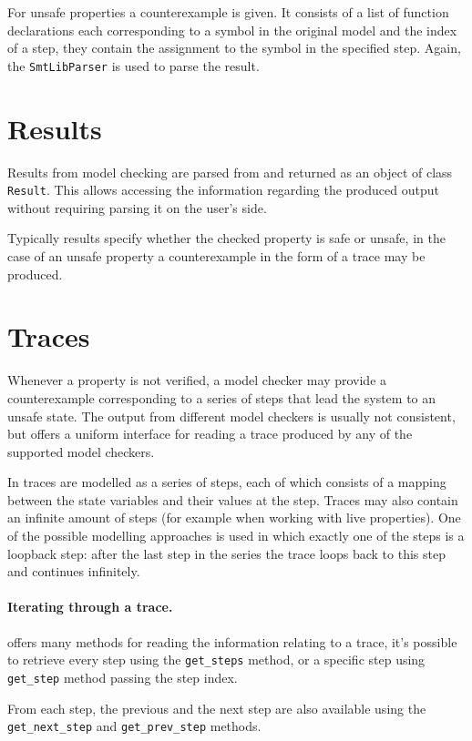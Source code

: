 For unsafe properties a counterexample is given. It consists of a list of function declarations each corresponding to a symbol in the original model and the index of a step, they contain the assignment to the symbol in the specified step. Again, the \texttt{SmtLibParser} is used to parse the result.


\section{Results}
Results from model checking are parsed from \pyvmt{} and returned as an object of class \texttt{Result}.
This allows accessing the information regarding the produced output without requiring parsing it on the user's side.

Typically results specify whether the checked property is safe or unsafe, in the case of an unsafe property a counterexample in the form of a trace may be produced.

\section{Traces}
Whenever a property is not verified, a model checker may provide a counterexample corresponding to a series of steps that lead the system to an unsafe state.
The output from different model checkers is usually not consistent, but \pyvmt{} offers a uniform interface for reading a trace produced by any of the supported model checkers.

In \pyvmt{} traces are modelled as a series of steps, each of which consists of a mapping between the state variables and their values at the step.
Traces may also contain an infinite amount of steps (for example when working with live properties).
One of the possible modelling approaches is used in which exactly one of the steps is a loopback step: after the last step in the series the trace loops back to this step and continues infinitely.

\paragraph*{Iterating through a trace.}
\pyvmt{} offers many methods for reading the information relating to a trace, it's possible to retrieve every step using the \texttt{get\_steps} method, or a specific step using \texttt{get\_step} method passing the step index.

From each step, the previous and the next step are also available using the \texttt{get\_next\_step} and \texttt{get\_prev\_step} methods.

